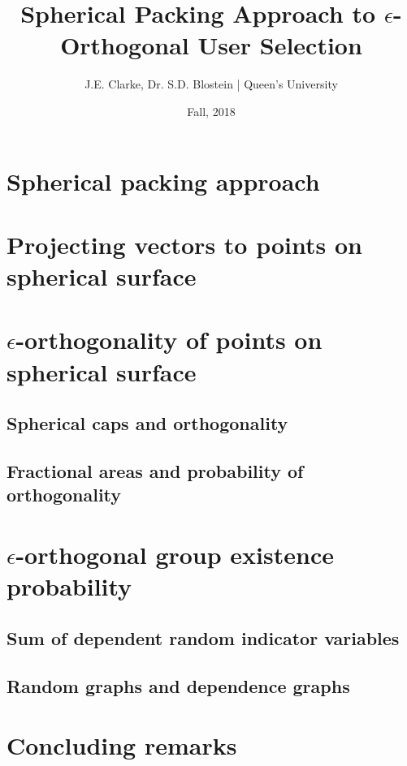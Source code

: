 \documentclass[11pt]{article}
\title{Spherical Packing Approach to $\epsilon$-Orthogonal User Selection}
\author{J.E. Clarke, Dr. S.D. Blostein | Queen's University}
\date{Fall, 2018}
\begin{document}
	\maketitle
	\newpage
    \section{Spherical packing approach}
        
        
    \section{Projecting vectors to points on spherical surface}\label{sec:chan_norm}
        
    \section{$\epsilon$-orthogonality of points on spherical surface}\label{sec:spherical_caps}
        \subsection{Spherical caps and orthogonality}
            
        \subsection{Fractional areas and probability of orthogonality}
            
    \section{$\epsilon$-orthogonal group existence probability}
        \subsection{Sum of dependent random indicator variables}
            
        \subsection{Random graphs and dependence graphs}
            
    \section{Concluding remarks}
        
    \newpage

    \newpage	
 	\begingroup
 		\renewcommand{\section}[2]{}%
 		
 		
 	\endgroup
\end{document}
